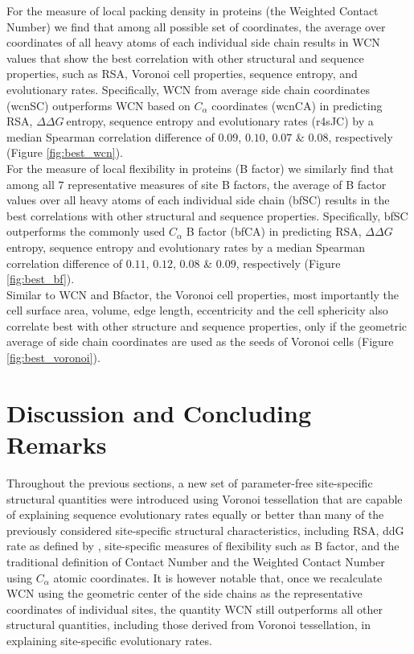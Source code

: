 \documentclass[11pt]{article}
\newcommand{\ddg}{$\Delta\Delta G~$}
\begin{document}
        For the measure of local packing density in proteins (the Weighted Contact Number) we find that among all possible set of coordinates, the average over coordinates of all heavy atoms of each individual side chain results in WCN values that show the best correlation with other structural and sequence properties, such as RSA, Voronoi cell properties, sequence entropy, and evolutionary rates. Specifically, WCN from average side chain coordinates (wcnSC) outperforms WCN based on $C_\alpha$ coordinates (wcnCA) in predicting RSA, \ddg entropy, sequence entropy and evolutionary rates (r4sJC) by a median Spearman correlation difference of $0.09$, $0.10$, $0.07$ \& $0.08$, respectively (Figure \ref{fig:best_wcn}).
        \\

        For the measure of local flexibility in proteins (B factor) we similarly find that among all $7$ representative measures of site B factors, the average of B factor values over all heavy atoms of each individual side chain (bfSC) results in the best correlations with other structural and sequence properties. Specifically, bfSC outperforms the commonly used $C_\alpha$ B factor (bfCA) in predicting RSA, \ddg entropy, sequence entropy and evolutionary rates by a median Spearman correlation difference of $0.11$, $0.12$, $0.08$ \& $0.09$, respectively (Figure \ref{fig:best_bf}).
        \\

        Similar to WCN and Bfactor, the Voronoi cell properties, most importantly the cell surface area, volume, edge length, eccentricity and the cell sphericity also correlate best with other structure and sequence properties, only if the geometric average of side chain coordinates are used as the seeds of Voronoi cells (Figure \ref{fig:best_voronoi}).
        \\

\section{Discussion and Concluding Remarks}
\label{sec:dcr}

		Throughout the previous sections, a new set of parameter-free site-specific structural quantities were introduced using Voronoi tessellation that are capable of explaining sequence evolutionary rates equally or better than many of the previously considered site-specific structural characteristics, including RSA, ddG rate as defined by \citet{Echave2014}, site-specific measures of flexibility such as B factor, and the traditional definition of Contact Number and the Weighted Contact Number using $C_\alpha$ atomic coordinates. It is however notable that, once we recalculate WCN using the geometric center of the side chains as the representative coordinates of individual sites, the quantity WCN still outperforms all other structural quantities, including those derived from Voronoi tessellation, in explaining site-specific evolutionary rates. 
		   
\end{document}
